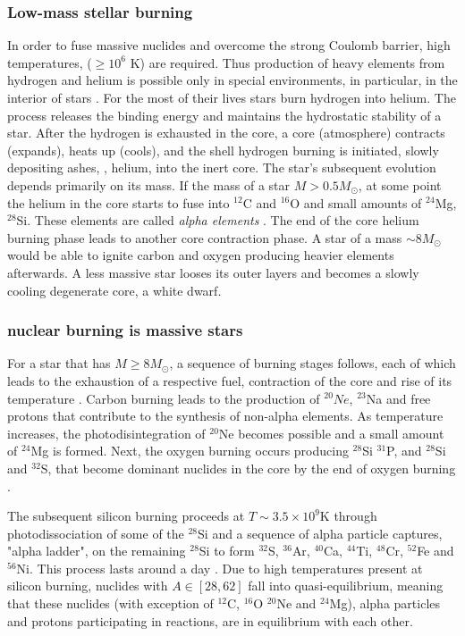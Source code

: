 \subsubsection{Low-mass stellar burning}

In order to fuse massive nuclides and overcome the strong Coulomb barrier, high temperatures, ($\geq 10^6$ K) are required. Thus production of heavy elements from hydrogen and helium is possible only in special environments, in particular, in the interior of stars \citep{Bethe:1939}. 
For the most of their lives stars burn hydrogen into helium. The process releases the binding energy and maintains the hydrostatic stability of a star. After the hydrogen is exhausted in the core, a core (atmosphere) contracts (expands), heats up (cools), and the shell hydrogen burning is initiated, slowly depositing ashes, \eg, helium, into the inert core. 
The star's subsequent evolution depends primarily on its mass. If the mass of a star $M>0.5M_{\odot}$, at some point the helium in the core starts to fuse into $^{12}$C and $^{16}$O and small amounts of $^{24}$Mg, $^{28}$Si. These elements are called \textit{alpha elements} \citep{Rolfs:1988,Hasen:2004}. 
The end of the core helium burning phase leads to another core contraction phase. A star of a mass $\sim 8M_{\odot}$ would be able to ignite carbon and oxygen producing heavier elements afterwards. A less massive star looses its outer layers and becomes a slowly cooling degenerate core, a white dwarf.


\subsubsection{nuclear burning is massive stars}

For a star that has $M\geq 8M_{\odot}$, a sequence of burning stages follows, each of which leads to the exhaustion of a respective fuel, contraction of the core and rise of its temperature \citep{Woosley:2002}. Carbon burning leads to the production of $^{20}Ne$, $^{23}$Na and free protons that contribute to the synthesis of non-alpha elements. As temperature increases, the photodisintegration of $^{20}$Ne becomes possible and a small amount of $^{24}$Mg is formed. Next, the oxygen burning occurs producing $^{28}$Si $^{31}$P, and $^{28}$Si and $^{32}$S, that become dominant nuclides in the core by the end of oxygen burning \citep{Rolfs:1988}.

The subsequent silicon burning proceeds at $T\sim3.5\times10^9$K through photodissociation of some of the $^{28}$Si and a sequence of alpha particle captures, "alpha ladder", on the remaining $^{28}$Si to form $^{32}$S, $^{36}$Ar, $^{40}$Ca, $^{44}$Ti, $^{48}$Cr, $^{52}$Fe and $^{56}$Ni. This process lasts around a day \citep{Rolfs:1988,Hasen:2004}. Due to high temperatures present at silicon burning, nuclides with $A\in[28, 62]$ fall into quasi-equilibrium, meaning that these nuclides (with exception of $^{12}$C, $^{16}$O $^{20}$Ne and $^{24}$Mg), alpha particles and protons participating in reactions, are in equilibrium with each other. 

